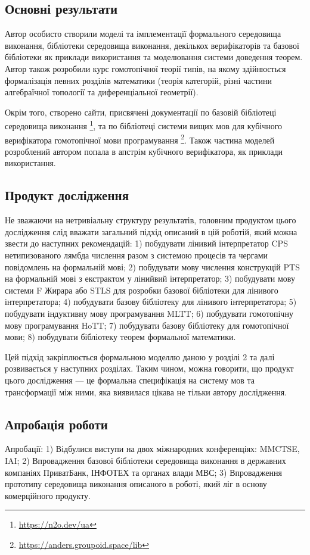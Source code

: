 \subsection{Основні результати}
Автор особисто створили моделі та імплементації формального середовища виконання,
бібліотеки середовища виконання, декількох верифікаторів та базової бібліотеки
як приклади використання та моделювання системи доведення теорем. Автор також
розробили курс гомотопічної теорії типів, на якому здійнюється формалізація
певних розділів математики (теорія категорій, різні частини алгебраїчної
топології та диференціальної геометрії).

Окрім того, створено сайти, присвячені документації по базовій бібліотеці
середовища виконання \footnote{\url{https://n2o.dev/ua}},
та по бібліотеці системи вищих мов для кубічного верифікатора гомотопічної
мови програмування \footnote{\url{https://anders.groupoid.space/lib}}. Також частина
моделей розроблений автором попала в апстрім кубічного верифікатора,
як приклади використання.

\newpage
\subsection{Продукт дослідження}
Не зважаючи на нетривіальну структуру результатів, головним продуктом цього
дослідження слід вважати загальний підхід описаний в цій роботій, який можна
звести до наступних рекомендацій:
1) побудувати лінивий інтерпретатор CPS нетипизованого лямбда числення разом
   з системою процесів та чергами повідомлень на формальній мові;
2) побудувати мову числення конструкцій PTS на формальній мові з екстрактом у лінийвий інтерпретатор;
3) побудувати мову системи F Жирара або STLS для розробки базової бібліотеки для лінивого інтерпретатора;
4) побудувати базову бібліотеку для лінивого інтерпретатора;
5) побудувати індуктивну мову програмування MLTT;
6) побудувати гомотопічну мову програмування HoTT;
7) побудувати базову бібліотеку для гомотопічної мови;
8) побудувати бібліотеку теорем формальної математики.

Цей підхід закріплюється формальною моделлю даною у розділі 2 та далі розвивається у наступних розділах.
Таким чином, можна говорити, що продукт цього дослідження --- це формальна специфікація на систему мов та
трансформації між ними, яка виявилася цікава не тільки автору дослідження.

\subsection{Апробація роботи}
Апробації:
1) Відбулися виступи на двох міжнародних конференціях: MMCTSE, IAI;
2) Впровадження базової бібліотеки середовища виконання в державних компаніях ПриватБанк,
   ІНФОТЕХ та органах влади МВС;
3) Впровадження прототипу середовища виконання описаного в роботі,
   який ліг в основу комерційного продукту.

